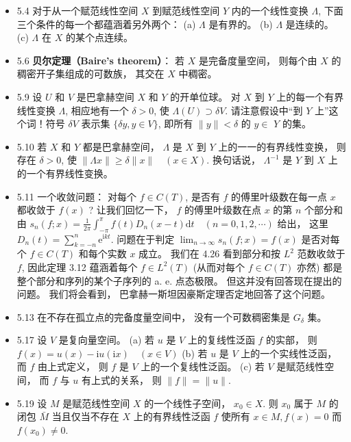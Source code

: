 \begin{itemize}
\item 5.4 对于从一个赋范线性空间 $X$ 到赋范线性空间 $Y$ 内的一个线性变换 $\Lambda$, 下面三个条件的每一个都蕴涵着另外两个： (a) $\Lambda$ 是有界的。 (b) $\Lambda$ 是连续的。 (c) $\Lambda$ 在 $X$ 的某个点连续。

\item 5.6 \textbf{贝尔定理（Baire's theorem）}： 若 $X$ 是完备度量空间， 则每个由 $X$ 的稠密开子集组成的可数族， 其交在 $X$ 中稠密。

\item 5.9 设 $U$ 和 $V$ 是巴拿赫空间 $X$ 和 $Y$ 的开单位球。 对 $X$ 到 $Y$ 上的每一个有界线性变换 $\Lambda$, 相应地有一个 $\delta>0$, 使 $\Lambda(U) \supset \delta V$. 请注意假设中“到 $Y$ 上”这个词！符号 $\delta V$ 表示集 $\{\delta y, y \in V\}$, 即所有 $\|y\|<\delta$ 的 $y \in$ $Y$ 的集。

\item 5.10 若 $X$ 和 $Y$ 都是巴拿赫空间， $\Lambda$ 是 $X$ 到 $Y$ 上的一一的有界线性变换， 则存在 $\delta>0$, 使 $\|\Lambda x\| \geqslant \delta\|x\| \quad(x \in X)$. 换句话说， $\Lambda^{-1}$ 是 $Y$ 到 $X$ 上的一个有界线性变换。

\item 5.11 一个收敛问题： 对每个 $f \in C(T)$, 是否有 $f$ 的傅里叶级数在每一点 $x$ 都收敛于 $f(x)$ ? 让我们回忆一下， $f$ 的傅里叶级数在点 $x$ 的第 $n$ 个部分和由 $s_{n}(f ; x)=\frac{1}{2 \pi} \int_{-\pi}^{\pi} f(t) D_{n}(x-t) \mathrm{d} t \quad(n=0,1,2, \cdots)$ 给出， 这里 $D_{n}(t)=\sum_{k=-n}^{n} \mathrm{e}^{\mathrm{i} k t}$. 问题在于判定 $\lim _{n \rightarrow \infty} s_{n}(f ; x)=f(x)$ 是否对每个 $f \in C(T)$ 和每个实数 $x$ 成立。 我们在 4.26 看到部分和按 $L^{2}$ 范数收敛于 $f$, 因此定理 3.12 蕴涵着每个 $f \in L^{2}(T)$ (从而对每个 $f \in C(T)$ 亦然) 都是整个部分和序列的某个子序列的 a. e. 点态极限。 但这并没有回答现在提出的问题。 我们将会看到， 巴拿赫一斯坦因豪斯定理否定地回答了这个问题。

\item 5.13 在不存在孤立点的完备度量空间中， 没有一个可数稠密集是 $G_{\delta}$ 集。

\item 5.17 设 $V$ 是复向量空间。 (a) 若 $u$ 是 $V$ 上的复线性泛函 $f$ 的实部， 则 $f(x)=u(x)-\mathrm{i} u(\mathrm{i} x) \quad(x \in V)$ (b) 若 $u$ 是 $V$ 上的一个实线性泛函， 而 $f$ 由上式定义， 则 $f$ 是 $V$ 上的一个复线性泛函。 (c) 若 $V$ 是赋范线性空间， 而 $f$ 与 $u$ 有上式的关系， 则 $\|f\|=\|u\|$.

\item 5.19 设 $M$ 是赋范线性空间 $X$ 的一个线性子空间， $x_{0} \in X$. 则 $x_{0}$ 属于 $M$ 的闭包 $\bar{M}$ 当且仅当不存在 $X$ 上的有界线性泛函 $f$ 使所有 $x \in M, f(x)=0$ 而 $f\left(x_{0}\right) \neq 0$.


\end{itemize}
